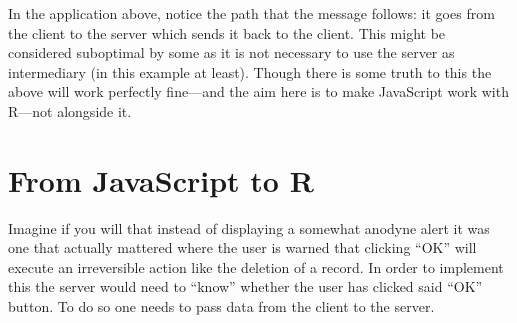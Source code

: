 \documentclass[
]{krantz}
\makeatletter
\newenvironment{Shaded}{\begin{snugshade}}{\end{snugshade}}
\newcommand{\ControlFlowTok}[1]{\textcolor[rgb]{0.27,0.27,0.27}{\textbf{#1}}}
\newcommand{\DataTypeTok}[1]{\textcolor[rgb]{0.27,0.27,0.27}{#1}}
\newcommand{\KeywordTok}[1]{\textcolor[rgb]{0.27,0.27,0.27}{\textbf{#1}}}
\newcommand{\NormalTok}[1]{#1}
\newcommand{\OperatorTok}[1]{\textcolor[rgb]{0.43,0.43,0.43}{\textbf{#1}}}
\newcommand{\StringTok}[1]{\textcolor[rgb]{0.5,0.5,0.5}{#1}}
\newenvironment{kframe}{%
\medskip{}
\setlength{\fboxsep}{.8em}
 \def\at@end@of@kframe{}%
 \ifinner\ifhmode%
  \def\at@end@of@kframe{\end{minipage}}%
  \begin{minipage}{\columnwidth}%
 \fi\fi%
 \def\FrameCommand##1{\hskip\@totalleftmargin \hskip-\fboxsep
 \colorbox{shadecolor}{##1}\hskip-\fboxsep
     \hskip-\linewidth \hskip-\@totalleftmargin \hskip\columnwidth}%
 \MakeFramed {\advance\hsize-\width
   \@totalleftmargin\z@ \linewidth\hsize
   \@setminipage}}%
 {\par\unskip\endMakeFramed%
 \at@end@of@kframe}
\renewenvironment{Shaded}{\begin{kframe}}{\end{kframe}}
\makeatother
\begin{document}
\begin{Shaded}
\end{Shaded}

In the application above, notice the path that the message follows: it goes from the client to the server which sends it back to the client. This might be considered suboptimal by some as it is not necessary to use the server as intermediary (in this example at least). Though there is some truth to this the above will work perfectly fine---and the aim here is to make JavaScript work with R---not alongside it.

\hypertarget{from-javascript-to-r}{%
\section{From JavaScript to R}\label{from-javascript-to-r}}

Imagine if you will that instead of displaying a somewhat anodyne alert it was one that actually mattered where the user is warned that clicking ``OK'' will execute an irreversible action like the deletion of a record. In order to implement this the server would need to ``know'' whether the user has clicked said ``OK'' button. To do so one needs to pass data from the client to the server.
\end{document}
